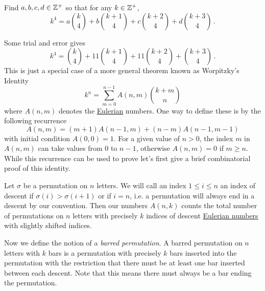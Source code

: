 \documentclass[a4paper, english, 12pt]{article} %
\begin{document}
\begin{subproblem}
  Find $a,b,c,d \in \mathbb{Z}^+$ so that for any $k \in \mathbb{Z}^+$,
  \begin{equation*}
    k^4 = a \binom{k}{4} + b \binom{k+1}{4} + c \binom{k+2}{4} + d \binom{k+3}{4}\,.
  \end{equation*}
\end{subproblem}

\begin{answer}
  Some trial and error gives
  \begin{equation*}
    k^4 = \binom{k}{4} + 11 \binom{k+1}{4} + 11\binom{k+2}{4} + \binom{k+3}{4}\,.
  \end{equation*}
  This is just a special case of a more general theorem known as
  Worpitzky’s Identity
  \begin{equation}
    \label{eq:worpitzky}
    k^n = \sum_{m=0}^{n-1} A(n, m) \binom{k + m}{n}
  \end{equation}
  where $A(n, m)$ denotes the
  \href{https://en.wikipedia.org/wiki/Eulerian_number}{Eulerian} numbers. One
  way to define these is by the following recurrence
  \begin{equation}
    \label{eq:reccurrence}
    A(n, m) = (m + 1) A(n - 1, m) + (n - m)A(n - 1, m - 1)
  \end{equation}
  with initial condition $A(0,0)=1$. For a given value of $n > 0$, the index $m$
  in $A(n, m)$ can take values from $0$ to $n - 1$, otherwise $A(n,m) =0$ if $m
  \geq n$. While this recurrence can be used to prove
   let's first give a brief
  combinatorial proof of this identity.

  Let $\sigma$ be a permutation on $n$ letters. We will call an index $1 \le i
  \le n$ an index of descent if $\sigma(i) > \sigma(i+1)$ or if $i=n$, i.e. a
  permutation will always end in a descent by our convention. Then our numbers
  $A(n,k)$ counts the total number of permutations on $n$ letters with precisely
  $k$ indices of descent \href{http://en.wikipedia.org/wiki/Eulerian_number}{Eulerian
  numbers} with slightly shifted
  indices.

  Now we define the notion of a \emph{barred permutation}. A barred permutation on
  $n$ letters with $k$ bars is a permutation with precisely $k$ bars inserted
  into the permutation with the restriction that there must be at least one bar
  inserted between each descent. Note that this means there must always be a bar
  ending the permutation.


\end{answer}
\end{document}
